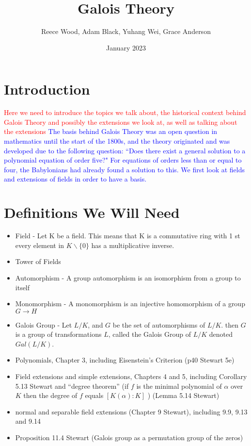 \documentclass[12pt]{article}
\title{\textbf{Galois Theory}}
\author{Reece Wood, Adam Black, Yuhang Wei, Grace Anderson}
\date{January 2023}
\theoremstyle{definition}
\begin{document}
\maketitle

\tableofcontents

\newpage
\section{Introduction}
\textcolor{red}{Here we need to introduce the topics we talk about, the historical context behind Galois Theory and possibly the extensions we look at, as well as talking about the extensions}
\textcolor{blue}{The basis behind Galois Theory was an open question in mathematics until the start of the 1800s, and the theory originated and was developed due to the following question: ``Does there exist a general solution to a polynomial equation of order five?"  For equations of orders less than or equal to four, the Babylonians had already found a solution to this.
We first look at fields and extensions of fields in order to have a basis.}
\section{Definitions We Will Need}
\begin{itemize}
    \item Field - Let K be a field. This means that K is a commutative ring with 1 st every element in $K \backslash \{0\}$ has a multiplicative inverse.
    \item Tower of Fields
    \item Automorphism - A group automorphism is an isomorphism from a group to itself
    \item Monomorphism - A monomorphism is an injective homomorphism of a group $G \rightarrow{} H$
    \item Galois Group - Let $L/K$, and $G$ be the set of automorphisms of $L/K$. then $G$ is a group of transformations $L$, called the Galois Group of $L/K$ denoted $Gal(L/K)$.
    \item Polynomials, Chapter 3, including Eisenstein’s Criterion (p40 Stewart 5e)
    \item Field extensions and simple extensions, Chapters 4 and 5, including Corollary 5.13 Stewart and ``degree theorem'' (if $f$ is the minimal polynomial of $\alpha$ over $K$ then the degree of $f$ equals $[K(\alpha) : K]$ ) (Lemma 5.14 Stewart)
    \item normal and separable field extensions (Chapter 9 Stewart), including 9.9, 9.13 and 9.14
    \item Proposition 11.4 Stewart (Galois group as a permutation group of the zeros)
\end{itemize}
\end{document}
